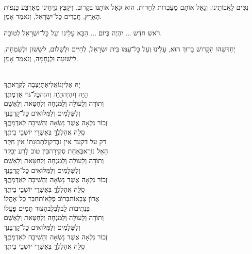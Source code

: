 \documentclass[twoside, openany, parskip=half, 11pt]{book}
\begin{document}
\\
נִסִּים לַאֲבוֹתֵינוּ, וְגָאַל אוֹתָם מֵעַבְדוּת לְחֵרוּת, הוּא יִגְאַל אוֹתָנוּ בְּקָרוֹב, וִיקַבֵּץ נִדָּחֵינוּ מֵאַרְבַּע כַּנְפוֹת הָאָרֶץ, חֲבֵרִים כׇּל־יִשְׂרָאֵל, וְנֹאמַר אָמֵן.

רֹאשׁ חֹדֶש ... יִהְיֶה בְּיוֹם ... הַבָּא עָלֵינוּ וְעַל כׇּל־יִשְׂרָאֵל לְטוֹבָה.

יְחַדְּשֵׁהוּ הַקָּדוֹשׁ בָּרוּךְ הוּא, עָלֵינוּ וְעַל כׇּל־עַמּוֹ בֵּית יִשְׂרָאֵל, לְחַיִּים וּלְשָׁלוֹם, לְשָׂשׂוֹן וּלְשִׂמְחָה, לִישׁוּעָה וּלְנֶחָמָה, וְנֹאמַר אָמֵן.

\begin{sometimes}
\negline
\begin{narrow}
\\
יָהּ אֵלִי\hfill וְגוֹאֲלִי\hfill אֶתְיַצְבָה לִקְרָאתֶֽךָ\\
הָיָה וְיִהְיֶה\hfill הָיָה וְהֹוֶה\hfill כׇּל־גּוֹי אַדְמָתֶֽךָ\\
וְתוֹדָה וְלָעוֹלָה וְלַמִּנְחָה וְלַחַטָּאת וְלָאָשָׁם \\
וְלַשְּׁלָמִים וְלַמִּלוּאִים כׇּל־קׇרְבָּנֶֽךָ\\
זְכוֹר נִלְאָה אֲשֶׁר נָשְׂאָה וְהָשִׁיבָה לְאַדְמָתֶֽךָ\\
סֶֽלָה אֲהַלְלֶֽךָּ בְּאַשְׁרֵי יוֹשְׁבֵי בֵיתֶֽךָ\\
דַּק עַל דַּק\hfill עַד אֵין נִבְדַק\hfill וְלִתְבוּנָתוֹ אֵין חֵֽקֶר\\
הָאֵל נוֹרָא\hfill בְּאַחַת סְקִירָה\hfill בֵּין טוֹב לָרַע יְבַקֵּר\\
וְתוֹדָה וְלָעוֹלָה וְלַמִּנְחָה וְלַחַטָּאת וְלָאָשָׁם \\
וְלַשְּׁלָמִים וְלַמִּלוּאִים כׇּל־קׇרְבָּנֶֽךָ\\
זְכוֹר נִלְאָה אֲשֶׁר נָשְׂאָה וְהָשִׁיבָה לְאַדְמָתֶֽךָ\\
סֶֽלָה אֲהַלְלֶֽךָּ בְּאַשְׁרֵי יוֹשְׁבֵי בֵיתֶֽךָ\\
אֲדוֹן צְבָאוֹת\hfill בְּרוֹב פְּלָאוֹת\hfill חִבֵּר כׇּל־אׇהֳלוֹ\\
בִּנְתִיבוֹת לֵב\hfill לִבְלֵב\hfill הַצּוּר תָּמִים פׇּעֳלוֹ\\
וְתוֹדָה וְלָעוֹלָה וְלַמִּנְחָה וְלַחַטָּאת וְלָאָשָׁם \\
וְלַשְּׁלָמִים וְלַמִּלוּאִים כׇּל־קׇרְבָּנֶֽךָ\\
זְכוֹר נִלְאָה אֲשֶׁר נָשְׂאָה וְהָשִׁיבָה לְאַדְמָתֶֽךָ\\
סֶֽלָה אֲהַלְלֶֽךָּ בְּאַשְׁרֵי יוֹשְׁבֵי בֵיתֶֽךָ
\end{narrow}

\end{sometimes}
\end{document}
